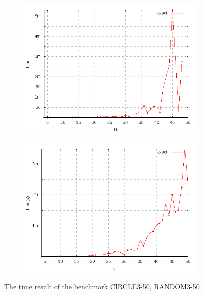 \begin{figure}[h]
	\centering
	\begin{subfigure}{.4\textwidth}
	\includegraphics[width=1\linewidth]{img/benchmark_circle.png}
	\caption{}
	\label{subfig:circle_performance}
	\end{subfigure}
	\begin{subfigure}{.4\textwidth}
	\includegraphics[width=1\linewidth]{img/firstAssignment/RANDOMTSPINSTANCE.png}
	\caption{}
	\label{subfig:random_performance}
	\end{subfigure}
	\caption{The time result of the benchmark CIRCLE3-50, RANDOM3-50}
\end{figure}



